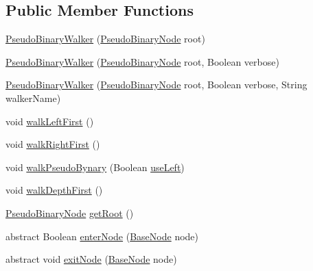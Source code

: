 \subsection*{Public Member Functions}
\begin{DoxyCompactItemize}
\item 
\hyperlink{classit_1_1emarolab_1_1cagg_1_1core_1_1PseudoBinaryNode_1_1PseudoBinaryWalker_acae591b8b8aa0bffa78cc37e106401bd}{Pseudo\-Binary\-Walker} (\hyperlink{classit_1_1emarolab_1_1cagg_1_1core_1_1PseudoBinaryNode}{Pseudo\-Binary\-Node} root)
\item 
\hyperlink{classit_1_1emarolab_1_1cagg_1_1core_1_1PseudoBinaryNode_1_1PseudoBinaryWalker_a17dea4b6f51354c7f38787b5b3571101}{Pseudo\-Binary\-Walker} (\hyperlink{classit_1_1emarolab_1_1cagg_1_1core_1_1PseudoBinaryNode}{Pseudo\-Binary\-Node} root, Boolean verbose)
\item 
\hyperlink{classit_1_1emarolab_1_1cagg_1_1core_1_1PseudoBinaryNode_1_1PseudoBinaryWalker_a510ba09411883d505e35e8f7797177e3}{Pseudo\-Binary\-Walker} (\hyperlink{classit_1_1emarolab_1_1cagg_1_1core_1_1PseudoBinaryNode}{Pseudo\-Binary\-Node} root, Boolean verbose, String walker\-Name)
\item 
void \hyperlink{classit_1_1emarolab_1_1cagg_1_1core_1_1PseudoBinaryNode_1_1PseudoBinaryWalker_a7a9b24427c2755eb26a0e54fb0fb6769}{walk\-Left\-First} ()
\item 
void \hyperlink{classit_1_1emarolab_1_1cagg_1_1core_1_1PseudoBinaryNode_1_1PseudoBinaryWalker_a9429c128a2f2d605481bae78d74480ab}{walk\-Right\-First} ()
\item 
void \hyperlink{classit_1_1emarolab_1_1cagg_1_1core_1_1PseudoBinaryNode_1_1PseudoBinaryWalker_ac32942712fdfb9ea4710695f86fa12b8}{walk\-Pseudo\-Bynary} (Boolean \hyperlink{classit_1_1emarolab_1_1cagg_1_1core_1_1PseudoBinaryNode_1_1PseudoBinaryWalker_ac29577f665f11fb4b4aedb55560cfad8}{use\-Left})
\item 
void \hyperlink{classit_1_1emarolab_1_1cagg_1_1core_1_1PseudoBinaryNode_1_1PseudoBinaryWalker_ab26658ab886020503732bed2033cdf46}{walk\-Depth\-First} ()
\item 
\hyperlink{classit_1_1emarolab_1_1cagg_1_1core_1_1PseudoBinaryNode}{Pseudo\-Binary\-Node} \hyperlink{classit_1_1emarolab_1_1cagg_1_1core_1_1PseudoBinaryNode_1_1PseudoBinaryWalker_ad3cd58e8a3592081886d19bf7b8de442}{get\-Root} ()
\item 
abstract Boolean \hyperlink{classit_1_1emarolab_1_1cagg_1_1core_1_1PseudoBinaryNode_1_1PseudoBinaryWalker_a3e5f875027f315206359036521971ce1}{enter\-Node} (\hyperlink{classit_1_1emarolab_1_1cagg_1_1core_1_1BaseNode}{Base\-Node} node)
\item 
abstract void \hyperlink{classit_1_1emarolab_1_1cagg_1_1core_1_1PseudoBinaryNode_1_1PseudoBinaryWalker_af7908006c5d08e7eda5469f176d189bb}{exit\-Node} (\hyperlink{classit_1_1emarolab_1_1cagg_1_1core_1_1BaseNode}{Base\-Node} node)
\end{DoxyCompactItemize}

